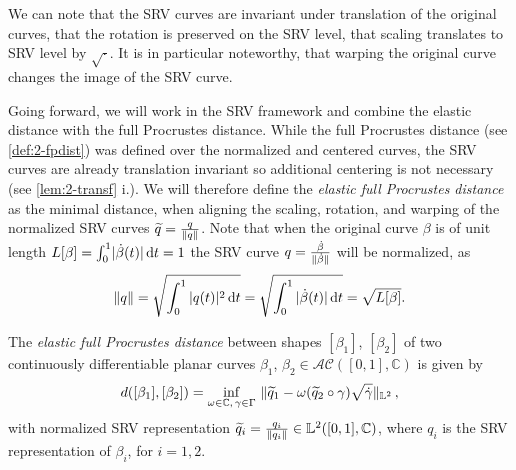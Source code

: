 \noindent We can note that the SRV curves are invariant under translation of the original curves, that the rotation is preserved on the SRV level, that scaling translates to SRV level by $\sqrt{\cdot}$.
It is in particular noteworthy, that warping the original curve changes the image of the SRV curve.

Going forward, we will work in the SRV framework and combine the elastic distance with the full Procrustes distance.
While the full Procrustes distance (see \cref{def:2-fpdist}) was defined over the normalized and centered curves, the SRV curves are already translation invariant so additional centering is not necessary (see \cref{lem:2-transf} i.).
We will therefore define the \emph{elastic full Procrustes distance} as the minimal distance, when aligning the scaling, rotation, and warping of the normalized SRV curves $\widetilde q = \frac{q}{\lVert q\rVert}$.
Note that when the original curve $\beta$ is of unit length $L[\beta] = \int_0^1 \lvert\dot\beta(t)\rvert \mathop{\mathrm{d}t} = 1$ the SRV curve $q = \frac{\dot\beta}{\lVert\dot\beta\rVert}$ will be normalized, as 
\begin{equation}
  \label{eq:2-norm}
  \lVert q\rVert = \sqrt{ \int_0^1 |q(t)|^2 \mathop{\mathrm{d}t}} = \sqrt{\int_0^1 |\dot{\beta}(t)| \mathop{\mathrm{d}t}} = \sqrt{L[\beta]}.
\end{equation}

\begin{definition}
  \label{def:2-elfpdist}
  The \emph{elastic full Procrustes distance} between shapes $[\beta_1]$, $[\beta_2]$ of two continuously differentiable planar curves $\beta_1$, $\beta_2 \in \mathcal{AC}([0,1],\mathbb{C})$  is given by 
    \begin{equation}
      \label{eq:2-elfpdist-def}
      d([\beta_1], [\beta_2]) = \inf_{\omega \in \mathbb{C},\, \gamma \in \Gamma} \,\, \lVert\widetilde q_1 - \omega (\widetilde q_2 \circ \gamma) \sqrt{\dot\gamma}\rVert_{\mathbb{L}^2}\,,
    \end{equation}
    with normalized SRV representation $\widetilde q_{i} = \frac{q_{i}}{\lVert q_{i}\rVert} \in \mathbb{L}^2([0,1], \mathbb{C})$, where $q_i$ is the SRV representation of $\beta_i$, for $i = 1,2$.
\end{definition}

